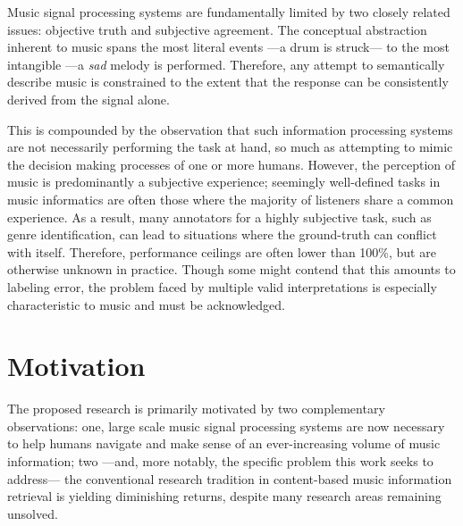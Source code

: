 Music signal processing systems are fundamentally limited by two closely related issues: objective truth and subjective agreement.
The conceptual abstraction inherent to music spans the most literal events ---a drum is struck--- to the most intangible ---a \emph{sad} melody is performed.
Therefore, any attempt to semantically describe music is constrained to the extent that the response can be consistently derived from the signal alone.

This is compounded by the observation that such information processing systems are not necessarily  performing the task at hand, so much as attempting to mimic the decision making processes of one or more humans.
However, the perception of music is predominantly a subjective experience; seemingly well-defined tasks in music informatics are often those where the majority of listeners share a common experience.
As a result, many annotators for a highly subjective task, such as genre identification, can lead to situations where the ground-truth can conflict with itself.
Therefore, performance ceilings are often lower than 100\%, but are otherwise unknown in practice.
Though some might contend that this amounts to labeling error, the problem faced by multiple valid interpretations is especially characteristic to music and must be acknowledged.





\section{Motivation}


The proposed research is primarily motivated by two complementary observations:
one, large scale music signal processing systems are now necessary to help humans navigate and make sense of an ever-increasing volume of music information;
two ---and, more notably, the specific problem this work seeks to address--- the conventional research tradition in content-based music information retrieval is yielding diminishing returns, despite many research areas remaining unsolved.

